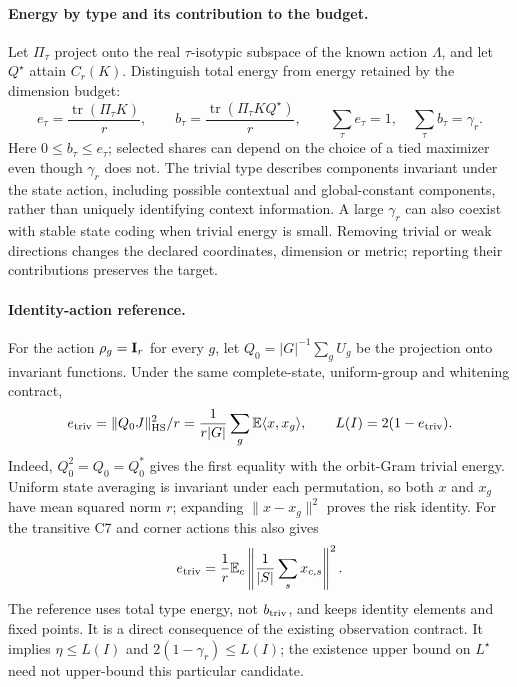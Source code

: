 \paragraph{Energy by type and its contribution to the budget.}
\label{sp:type-energy}
Let $\Pi_\tau$ project onto the real $\tau$-isotypic subspace of the known action $\Lambda$, and let $Q^\star$ attain $C_r(K)$. Distinguish total energy from energy retained by the dimension budget:
\[
 e_\tau=\frac{\operatorname{tr}(\Pi_\tau K)}r,\qquad
 b_\tau=\frac{\operatorname{tr}(\Pi_\tau KQ^\star)}r,\qquad
 \sum_\tau e_\tau=1,\quad\sum_\tau b_\tau=\gamma_r.
\]
Here $0\le b_\tau\le e_\tau$; selected shares can depend on the choice of a tied maximizer even though $\gamma_r$ does not. The trivial type describes components invariant under the state action, including possible contextual and global-constant components, rather than uniquely identifying context information. A large $\gamma_r$ can also coexist with stable state coding when trivial energy is small. Removing trivial or weak directions changes the declared coordinates, dimension or metric; reporting their contributions preserves the target.

\paragraph{Identity-action reference.}
\label{sp:identity-reference}
For the action $\rho_g=\mathbf{I}_r$ for every $g$, let $Q_0=|G|^{-1}\sum_gU_g$ be the projection onto invariant functions. Under the same complete-state, uniform-group and whitening contract,
\[
 e_{\rm triv}=\|Q_0J\|_{\rm HS}^2/r
 =\frac1{r|G|}\sum_g\mathbb E\langle x,x_g\rangle,
 \qquad L(I)=2(1-e_{\rm triv}).
\]
Indeed, $Q_0^2=Q_0=Q_0^*$ gives the first equality with the orbit-Gram trivial energy. Uniform state averaging is invariant under each permutation, so both $x$ and $x_g$ have mean squared norm $r$; expanding $\|x-x_g\|^2$ proves the risk identity. For the transitive C7 and corner actions this also gives
\[
 e_{\rm triv}=\frac1r\mathbb E_c\left\|\frac1{|S|}\sum_s x_{c,s}\right\|^2.
\]
The reference uses total type energy, not $b_{\rm triv}$, and keeps identity elements and fixed points. It is a direct consequence of the existing observation contract. It implies $\eta\le L(I)$ and $2(1-\gamma_r)\le L(I)$; the existence upper bound on $L^\star$ need not upper-bound this particular candidate.

